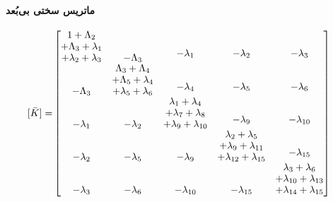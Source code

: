 \paragraph{ماتریس سختی بی‌بُعد}
\begin{equation}\label{Eq.stiffness_matrix_dimensionless}
\begin{aligned}
[\bar{K}] = & 
\begin{bmatrix}
\shortstack{$1 + \Lambda_2$ \\ $+ \Lambda_3 + \lambda_1$ \\ $+ \lambda_2 + \lambda_3$} & -\Lambda_3 & \shortstack{$-\lambda_1$ \\ \,} & \shortstack{$-\lambda_2$ \\ \,} & \shortstack{$-\lambda_3$ \\ \,} \\
-\Lambda_3 & \shortstack{$\Lambda_3 + \Lambda_4$ \\ $+ \Lambda_5 + \lambda_4$ \\ $+ \lambda_5 + \lambda_6$} & \shortstack{$-\lambda_4$ \\ \,} & \shortstack{$-\lambda_5$ \\ \,} & \shortstack{$-\lambda_6$ \\ \,} \\
-\lambda_1 & -\lambda_2 & \shortstack{$\lambda_1 + \lambda_4$ \\ $+ \lambda_7 + \lambda_8$ \\ $+ \lambda_9 + \lambda_{10}$} & \shortstack{$-\lambda_9$ \\ \,} & \shortstack{$-\lambda_{10}$ \\ \,} \\
-\lambda_2 & -\lambda_5 & -\lambda_9 & \shortstack{$\lambda_2 + \lambda_5$ \\ $+ \lambda_9 + \lambda_{11}$ \\ $+ \lambda_{12} + \lambda_{15}$} & \shortstack{$-\lambda_{15}$ \\ \,} \\
-\lambda_3 & -\lambda_{6} & -\lambda_{10} & -\lambda_{15} & \shortstack{$\lambda_3 + \lambda_6$ \\ $+ \lambda_{10} + \lambda_{13}$ \\ $+ \lambda_{14} + \lambda_{15}$}
\end{bmatrix}
\end{aligned}
\end{equation}

